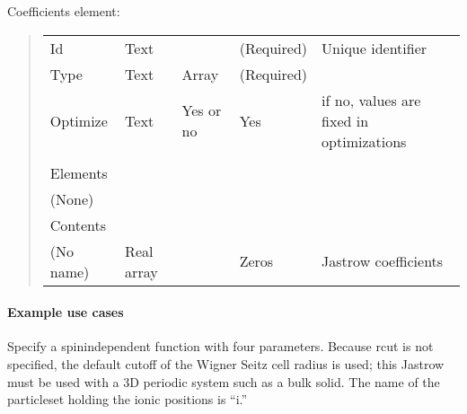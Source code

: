 \documentclass[letterpaper,10pt,english]{sphinxmanual}
\begin{document}
Coefficients element:
\begin{quote}


\begin{savenotes}\sphinxattablestart
\centering
\begin{tabulary}{\linewidth}[t]{|T|T|T|T|T|}
\hline

&
&
&
&
\\
\hline
Id
&
Text
&&
(Required)
&
Unique
identifier
\\
\hline
Type
&
Text
&
Array
&
(Required)
&\\
\hline
Optimize
&
Text
&
Yes or no
&
Yes
&
if no,
values are
fixed in
optimizations
\\
\hline&&&&\\
\hline
Elements
&&&&\\
\hline
(None)
&&&&\\
\hline
Contents
&&&&\\
\hline
(No name)
&
Real array
&&
Zeros
&
Jastrow
coefficients
\\
\hline
\end{tabulary}
\par
\sphinxattableend\end{savenotes}
\end{quote}


\paragraph{Example use cases}
\label{\detokenize{intro_wavefunction:example-use-cases}}\label{\detokenize{intro_wavefunction:bjsplineexamples}}
Specify a spin\sphinxhyphen{}independent function with four parameters. Because rcut  is not
specified, the default cutoff of the Wigner Seitz cell radius is used; this
Jastrow must be used with a 3D periodic system such as a bulk solid. The name of
the particleset holding the ionic positions is “i.”
\end{document}
